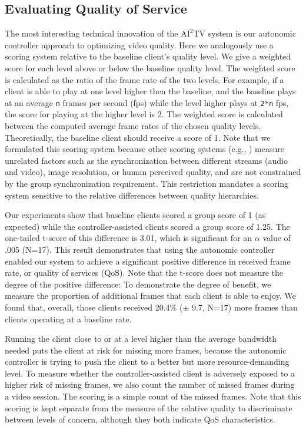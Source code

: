 \documentclass{sig-alternate}
\begin{document}
\subsection{Evaluating Quality of Service} 

The most interesting technical innovation of the $\mathrm{AI}^2$TV
system is our autonomic controller approach to optimizing video
quality.  Here we analogously use a scoring system relative to the
baseline client's quality level.  We give a weighted score for each
level above or below the baseline quality level.  The weighted score
is calculated as the ratio of the frame rate of the two levels.  For
example, if a client is able to play at one level higher then the
baseline, and the baseline plays at an average \texttt{n} frames per
second (fps) while the level higher plays at \texttt{2*n} fps, the
score for playing at the higher level is 2.  The weighted score is
calculated between the computed average frame rates of the chosen
quality levels.  Theoretically, the baseline client should receive a
score of 1.  Note that we formulated this scoring system because other
scoring systems (e.g., \cite{BAQAI,CORTE,CONWAY2000}) measure
unrelated factors such as the synchronization between different
streams (audio and video), image resolution, or human perceived
quality, and are not constrained by the group synchronization
requirement.  This restriction mandates a scoring system sensitive to
the relative differences between quality hierarchies.

Our experiments show that baseline clients scored a group score of 1
(as expected) while the controller-assisted clients scored a group
score of 1.25.  The one-tailed t-score of this difference is 3.01,
which is significant for an $\alpha$ value of .005 (N=17).  This
result demonstrates that using the autonomic controller enabled our
system to achieve a significant positive difference in received frame
rate, or quality of services (QoS).  Note that the t-score does not
measure the degree of the positive difference: To demonstrate the
degree of benefit, we measure the proportion of additional frames that
each client is able to enjoy.  We found that, overall, those clients
received 20.4\% ($\pm$ 9.7, N=17) more frames than clients operating
at a baseline rate.

Running the client close to or at a level higher than the average
bandwidth needed puts the client at risk for missing more frames,
because the autonomic controller is trying to push the client to a
better but more resource-demanding level.  To measure whether the
controller-assisted client is adversely exposed to a higher risk of
missing frames, we also count the number of missed frames during a
video session.  The scoring is a simple count of the missed frames.
Note that this scoring is kept separate from the measure of the
relative quality to discriminate between levels of concern, although
they both indicate QoS characteristics.
\end{document}
